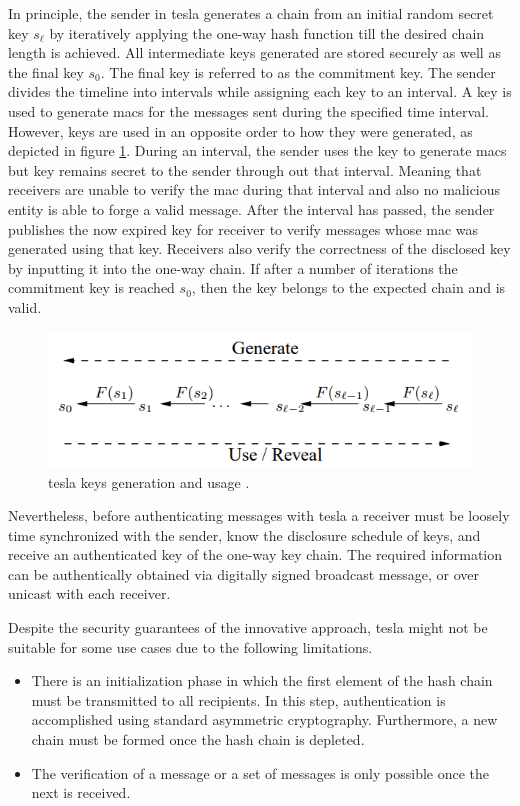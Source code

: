 In principle, the sender in \gls{tesla} generates a chain from an initial random secret key $s_\ell$ by iteratively applying the one-way hash function till the desired chain length is achieved. All intermediate keys generated are stored securely as well as the final key $s_0$. The final key is referred to as the commitment key. The sender divides the timeline into intervals while assigning each key to an interval. A key is used to generate \glspl{mac} for the messages sent during the specified time interval. However, keys are used in an opposite order to how they were generated, as depicted in figure \ref{fig:tesla}. During an interval, the sender uses the key to generate \glspl{mac} but key remains secret to the sender through out that interval. Meaning that receivers are unable to verify the \gls{mac} during that interval and also no malicious entity is able to forge a valid message. After the interval has passed, the sender publishes the now expired key for receiver to verify messages whose \gls{mac} was generated using that key. Receivers also verify the correctness of the disclosed key by inputting it into the one-way chain. If after a number of iterations the commitment key is reached $s_0$, then the key belongs to the expected chain and is valid.
\begin{figure}[hptb]
	\centering
	\includegraphics[scale=0.65]{Images/tesla.png}
	\caption{\gls{tesla} keys generation and usage \cite{perrig2003tesla}.}
	\label{fig:tesla}
\end{figure}
\par
Nevertheless, before authenticating messages with \gls{tesla} a receiver must be loosely time synchronized with
the sender, know the disclosure schedule of keys, and receive an authenticated key of the one-way key chain. The required information can be authentically obtained via digitally signed broadcast message, or over unicast with each receiver.
\par
Despite the security guarantees of the innovative approach, \gls{tesla} might not be suitable for some use cases due to the following limitations.
\begin{itemize}
	\item There is an initialization phase in which the first element of the hash chain must be transmitted to all recipients. In this step, authentication is accomplished using standard asymmetric cryptography. Furthermore, a new chain must be formed once the hash chain is depleted.
	\item The verification of a message or a set of messages is only possible once the next is received.
\end{itemize}

